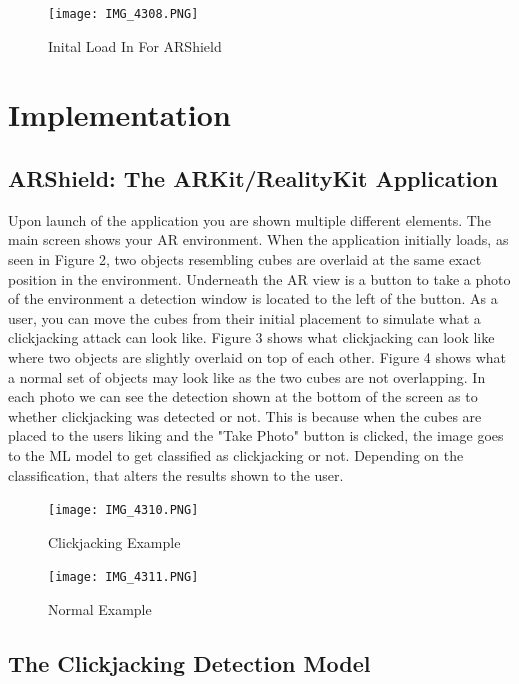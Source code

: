 \documentclass[conference]{IEEEtran}
\begin{document}
\begin{figure}
  \centering
  \texttt{[image: IMG\_4308.PNG]}
  \caption{Inital Load In For ARShield}
  \label{fig:example}
\end{figure}

\section{Implementation}

\subsection{ARShield: The ARKit/RealityKit Application}

Upon launch of the application you are shown multiple different elements. The main screen shows your AR environment. When the application initially loads, as seen in Figure 2, two objects resembling cubes are overlaid at the same exact position in the environment. Underneath the AR view is a button to take a photo of the environment a detection window is located to the left of the button. As a user, you can move the cubes from their initial placement to simulate what a clickjacking attack can look like. Figure 3 shows what clickjacking can look like where two objects are slightly overlaid on top of each other. Figure 4 shows what a normal set of objects may look like as the two cubes are not overlapping. In each photo we can see the detection shown at the bottom of the screen as to whether clickjacking was detected or not. This is because when the cubes are placed to the users liking and the "Take Photo" button is clicked, the image goes to the ML model to get classified as clickjacking or not. Depending on the classification, that alters the results shown to the user.

\begin{figure}
  \centering
  \texttt{[image: IMG\_4310.PNG]}
  \caption{Clickjacking Example}
  \label{fig:example}
\end{figure}

\begin{figure}
  \centering
  \texttt{[image: IMG\_4311.PNG]}
  \caption{Normal Example}
  \label{fig:example}
\end{figure}

\subsection{The Clickjacking Detection Model}
\end{document}
